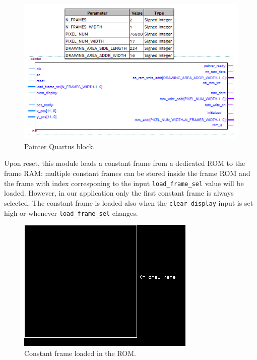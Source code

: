 \documentclass[11pt]{report}
\begin{document}
\begin{figure}[!h]
    \centering
    \includegraphics[width=0.8\linewidth]{images/graphic_interface_design/painter/painter_quartus_block.png}
    \caption{Painter Quartus block.}
    \label{fig:painter_quartus_block}
\end{figure}

Upon reset, this module loads a constant frame from a dedicated ROM to the frame RAM: multiple constant frames can be stored inside the frame ROM and the frame with index corresponing to the input \texttt{load\_frame\_sel} value will be loaded. However, in our application only the first constant frame is always selected. The constant frame is loaded also when the \texttt{clear\_display} input is set high or whenever \texttt{load\_frame\_sel} changes.

\begin{figure}[!h]
    \centering
    \includegraphics[width=0.5\linewidth]{images/graphic_interface_design/painter/constant_frame.png}
    \caption{Constant frame loaded in the ROM.}
    \label{fig:constant_frame}
\end{figure}
\end{document}
